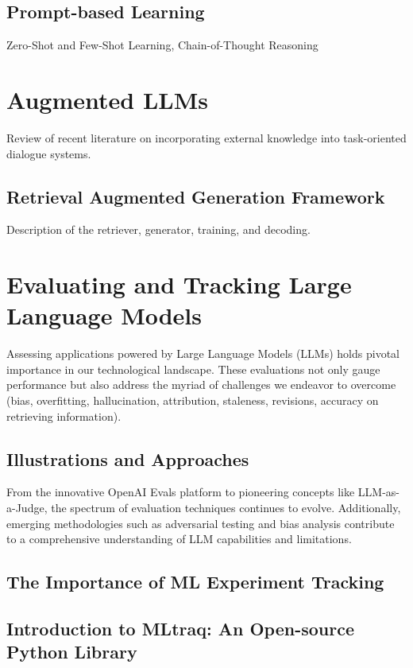 \subsection{Prompt-based Learning}
Zero-Shot and Few-Shot Learning, Chain-of-Thought Reasoning

\section{Augmented LLMs}
Review of recent literature on incorporating external knowledge into task-oriented dialogue systems.

\subsection{Retrieval Augmented Generation Framework}
Description of the retriever, generator, training, and decoding.

\section{Evaluating and Tracking Large Language Models}
Assessing applications powered by Large Language Models (LLMs) holds pivotal importance in our technological landscape. These evaluations not only gauge performance but also address the myriad of challenges we endeavor to overcome (bias, overfitting, hallucination, attribution, staleness, revisions, accuracy on retrieving information).

\subsection{Illustrations and Approaches}

From the innovative OpenAI Evals platform to pioneering concepts like LLM-as-a-Judge, the spectrum of evaluation techniques continues to evolve. Additionally, emerging methodologies such as adversarial testing and bias analysis contribute to a comprehensive understanding of LLM capabilities and limitations.

\subsection{The Importance of ML Experiment Tracking}

\subsection{Introduction to MLtraq: An Open-source Python Library}

